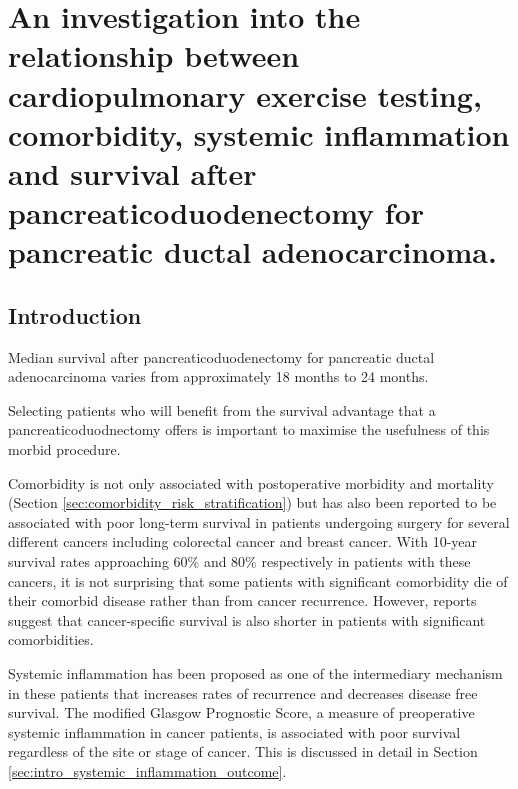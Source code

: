 
\chapter{An investigation into the relationship between cardiopulmonary exercise testing, comorbidity, systemic inflammation and survival after pancreaticoduodenectomy for pancreatic ductal adenocarcinoma.}
\label{ch_survival}


\clearpage

\section{Introduction}
Median survival after pancreaticoduodenectomy for pancreatic ductal adenocarcinoma varies from approximately 18 months to 24 months.\parencite{winter_1423_2006,neoptolemos_adjuvant_2010} 

Selecting patients who will benefit from the survival advantage that a pancreaticoduodnectomy offers is important to maximise the usefulness of this morbid procedure.

Comorbidity is not only associated with postoperative morbidity and mortality (Section \ref{sec:comorbidity_risk_stratification}) but has also been reported to be associated with poor long-term survival in patients undergoing surgery for several different cancers including colorectal cancer \parencite{} and breast cancer.\parencite{} With 10-year survival rates approaching 60\% and 80\% respectively in patients with these cancers, it is not surprising that some patients with significant comorbidity die of their comorbid disease rather than from cancer recurrence. However, reports suggest that cancer-specific survival is also shorter in patients with significant comorbidities.

Systemic inflammation has been proposed as one of the intermediary mechanism in these patients that increases rates of recurrence and decreases disease free survival. The modified Glasgow Prognostic Score, a measure of preoperative systemic inflammation in cancer patients, is associated with poor survival regardless of the site or stage of cancer. This is discussed in detail in Section \ref{sec:intro_systemic_inflammation_outcome}. 

